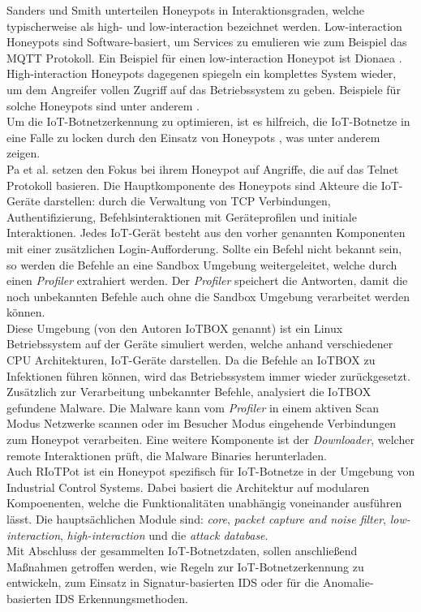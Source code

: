 Sanders und Smith unterteilen Honeypots in Interaktionsgraden, welche typischerweise als high- und low-interaction bezeichnet werden. Low-interaction Honeypots sind Software-basiert, um Services zu emulieren wie zum Beispiel das MQTT Protokoll. Ein Beispiel für einen low-interaction Honeypot ist Dionaea \cite{DBLP:conf/iccst/SethiaJ19}. High-interaction Honeypots dagegenen spiegeln ein komplettes System wieder, um dem Angreifer vollen Zugriff auf das Betriebssystem zu geben. Beispiele für solche Honeypots sind unter anderem \cite{DBLP:journals/jip/PaSYMKR16,Srinivasa_2021}. \\[0.2in]

Um die IoT-Botnetzerkennung zu optimieren, ist es hilfreich, die IoT-Botnetze in eine Falle zu locken durch den Einsatz von Honeypots \cite{Xing2021SurveyOB}, was unter anderem \cite{DBLP:journals/corr/abs-2305-06430,DBLP:conf/sigcomm/MetongnonS18,DBLP:journals/jip/PaSYMKR16} zeigen. \\ 
Pa et al. \cite{DBLP:journals/jip/PaSYMKR16} setzen den Fokus bei ihrem Honeypot auf Angriffe, die auf das Telnet Protokoll basieren. Die Hauptkomponente des Honeypots sind Akteure die IoT-Geräte darstellen: durch die Verwaltung von TCP Verbindungen, Authentifizierung, Befehlsinteraktionen mit Geräteprofilen und initiale Interaktionen. Jedes IoT-Gerät besteht aus den vorher genannten Komponenten mit einer zusätzlichen Login-Aufforderung. Sollte ein Befehl nicht bekannt sein, so werden die Befehle an eine Sandbox Umgebung weitergeleitet, welche durch einen \textit{Profiler} extrahiert werden. Der \textit{Profiler} speichert die Antworten, damit die noch unbekannten Befehle auch ohne die Sandbox Umgebung verarbeitet werden können. \\ Diese Umgebung (von den Autoren IoTBOX genannt) ist ein Linux Betriebssystem auf der Geräte simuliert werden, welche anhand verschiedener CPU Architekturen, IoT-Geräte darstellen. Da die Befehle an IoTBOX zu Infektionen führen können, wird das Betriebssystem immer wieder zurückgesetzt. Zusätzlich zur Verarbeitung unbekannter Befehle, analysiert die IoTBOX gefundene Malware. Die Malware kann vom \textit{Profiler} in einem aktiven Scan Modus Netzwerke scannen oder im Besucher Modus eingehende Verbindungen zum Honeypot verarbeiten. Eine weitere Komponente ist der \textit{Downloader}, welcher remote Interaktionen prüft, die Malware Binaries herunterladen.  \\[0.2in]

Auch RIoTPot\cite{Srinivasa_2021,DBLP:conf/acsac/SrinivasaPV22} ist ein Honeypot spezifisch für IoT-Botnetze in der Umgebung von Industrial Control Systems. Dabei basiert die Architektur auf modularen Kompoenenten, welche die Funktionalitäten unabhängig voneinander ausführen lässt. Die hauptsächlichen Module sind: \textit{core}, \textit{packet capture and noise filter}, \textit{low-interaction}, \textit{high-interaction} und die \textit{attack database}. \\
Mit Abschluss der gesammelten IoT-Botnetzdaten, sollen anschließend Maßnahmen getroffen werden, wie Regeln zur IoT-Botnetzerkennung zu entwickeln, zum Einsatz in Signatur-basierten IDS oder für die Anomalie-basierten IDS Erkennungsmethoden.

